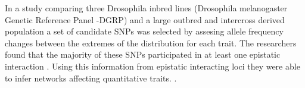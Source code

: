 In a study comparing three Drosophila inbred lines (Drosophila melanogaster Genetic Reference Panel -DGRP) and a large outbred and intercross derived  population \cite{huang2012epistasis}a set of candidate SNPs was selected by assesing allele frequency changes between the extremes of the distribution for each trait. 
The researchers found that the majority of these SNPs participated in at least one epistatic interaction \cite{huang2012epistasis}.
Using this information from epistatic interacting loci they were able to infer networks affecting quantitative traits. \cite{huang2012epistasis}.



